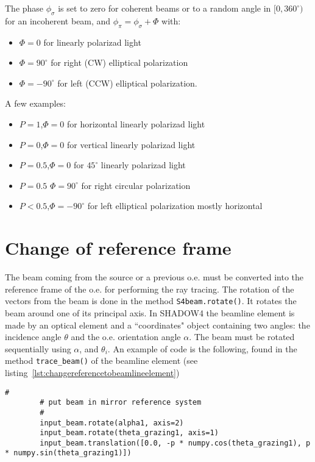 \documentclass{iucr}
\begin{document}
The phase $\phi_\sigma$ is set to zero for coherent beams or to a random angle in $[0,360^{\circ})$ for an incoherent beam, and
$\phi_\pi=\phi_\sigma+\Phi$ with: 
\begin{itemize}
 \item $\Phi=0$ for linearly polarizad light 
 \item $\Phi=90^{\circ}$ for right (CW) elliptical polarization
 \item $\Phi=-90^{\circ}$ for left (CCW) elliptical polarization.
\end{itemize}
A few examples: 
\begin{itemize}
 \item $P=1$,$\Phi=0$ for horizontal linearly polarizad light 
 \item $P=0$,$\Phi=0$ for vertical linearly polarizad light
 \item $P=0.5$,$\Phi=0$ for $45^\circ$ linearly polarizad light
 \item $P=0.5$ $\Phi=90^{\circ}$ for right circular polarization
 \item $P<0.5$,$\Phi=-90^{\circ}$ for left elliptical polarization mostly horizontal
\end{itemize}


\section{Change of reference frame}
\label{sec:change_frame}

The beam coming from the source or a previous o.e. must be converted into the reference frame of the o.e. for performing the ray tracing.
The rotation of the vectors from the beam is done  in the method {\tt S4beam.rotate()}.
It rotates the beam around one of its principal axis.
In SHADOW4 the beamline element is made by an optical element and a ``coordinates" object containing two angles: the incidence angle $\theta$ and the o.e. orientation angle $\alpha$.
The beam must be rotated sequentially using $\alpha$, and $\theta_i$.
An example of code is the following, found in the method {\tt trace\_beam()} of the beamline element (see listing~\ref{lst:changereferencetobeamlineelement})

\begin{lstlisting}[caption={Piece of code that changes the beam from the source reference frame to the local beamline element frame.}, label={lst:changereferencetobeamlineelement}, captionpos=b]
        #
        # put beam in mirror reference system
        #
        input_beam.rotate(alpha1, axis=2)
        input_beam.rotate(theta_grazing1, axis=1)
        input_beam.translation([0.0, -p * numpy.cos(theta_grazing1), p * numpy.sin(theta_grazing1)])
\end{lstlisting}
\end{document}

